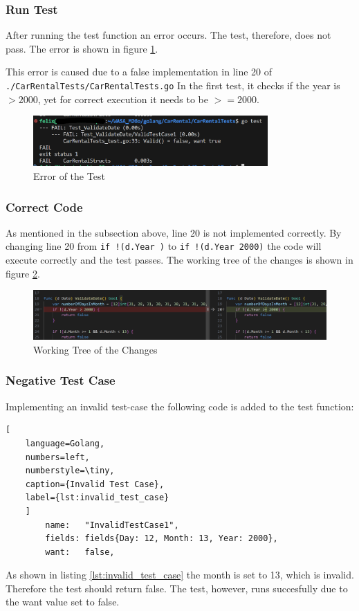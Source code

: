\subsubsection*{Run Test}
After running the test function an error occurs. 
The test, therefore, does not pass.
The error is shown in figure \ref{fig:car_rental_test_error}.

This error is caused due to a false implementation in line 20 of \hfill \linebreak \texttt{./CarRentalTests/CarRentalTests.go}
In the first test, it checks if the year is $>2000$, yet for correct execution it needs to be $>=2000$.

\begin{figure}[H]
    \centering
    \includegraphics[width=0.8\textwidth]{figures/goLang/carRental/carRental_dateTestError.png}
    \caption{Error of the Test}
    \label{fig:car_rental_test_error}
\end{figure}

\subsubsection*{Correct Code}
As mentioned in the subsection above, line 20 is not implemented correctly.
By changing line 20 from \texttt{if !(d.Year )} to \texttt{if !(d.Year \>\= 2000)} the code will execute correctly and the test passes.
The working tree of the changes is shown in figure \ref{fig:car_rental_test_working_tree}.

\begin{figure}[H]
    \centering
    \includegraphics[width=\textwidth]{figures/goLang/carRental/carRental_dateTestWorkingTree.png}
    \caption{Working Tree of the Changes}
    \label{fig:car_rental_test_working_tree}
\end{figure}

\subsubsection*{Negative Test Case}
Implementing an invalid test-case the following code is added to the test function:
\begin{lstlisting}[
    language=Golang,
    numbers=left,
    numberstyle=\tiny,
    caption={Invalid Test Case},
    label={lst:invalid_test_case}
    ]
	    name:   "InvalidTestCase1",
        fields: fields{Day: 12, Month: 13, Year: 2000},
	    want:   false,  
\end{lstlisting}

As shown in listing \ref{lst:invalid_test_case} the month is set to 13, which is invalid.
Therefore the test should return false.
The test, however, runs succesfully due to the want value set to false.
